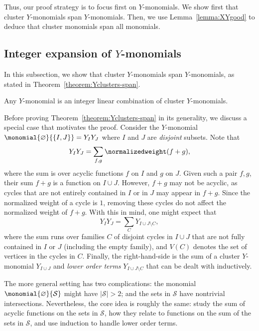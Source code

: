 Thus, our proof strategy is to focus first on \(Y\)-monomials. We show first that cluster \(Y\)-monomials span \(Y\)-monomials. Then, we use Lemma~\ref{lemma:XYgood} to deduce that cluster monomials span all monomials. 

\subsection{Integer expansion of \texorpdfstring{\(Y\)}{Y}-monomials} \label{subsection:Ymonomialsspanning}

In this subsection, we show that cluster \(Y\)-monomials span \(Y\)-monomials, as stated in Theorem~\ref{theorem:Yclusters-span}.

\begin{theo} \label{theorem:Yclusters-span}
    Any \(Y\)-monomial is an integer linear combination of cluster \(Y\)-monomials.
\end{theo}

Before proving Theorem~\ref{theorem:Yclusters-span} in its generality,
we discuss a special case that motivates the proof.
Consider the \(Y\)-monomial \(\monomial{\varnothing}{\{I, J\}} = Y_I Y_J\)
where \(I\) and \(J\) are \emph{disjoint} subsets.
Note that 
\begin{equation*}
    Y_I Y_J = \sum_{f, g} \normalizedweight(f + g),
\end{equation*}
where the sum is over acyclic functions \(f\) on \(I\) and \(g\) on \(J\).
Given such a pair \(f, g\), their sum \(f + g\) is a function on \(I \cup J\).
However, \(f + g\) may not be acyclic,
as cycles that are not entirely contained in \(I\) or in \(J\) may appear in \(f + g\).
Since the normalized weight of a cycle is \(1\),
removing these cycles do not affect the normalized weight of \(f + g\).
With this in mind, one might expect that
\begin{equation*}
    Y_I Y_J = \sum_{C} Y_{I \cup J \setminus C},
\end{equation*}
where the sum runs over families \(C\) of disjoint cycles in \(I \cup J\)
that are not fully contained in \(I\) or \(J\) (including the empty family),
and \(V(C)\) denotes the set of vertices in the cycles in \(C\).
Finally, the right-hand-side is the sum of a cluster \(Y\)-monomial \(Y_{I \cup J}\)
and \emph{lower order terms} \(Y_{I \cup J \setminus C}\) that can be dealt with inductively.

The more general setting has two complications:
the monomial \(\monomial{\varnothing}{\mathcal{S}}\) might have \(|\mathcal{S}| > 2\);
and the sets in \(\mathcal{S}\) have nontrivial intersections.
Nevertheless, the core idea is roughly the same:
study the sum of acyclic functions on the sets in \(\mathcal{S}\),
how they relate to functions on the sum of the sets in \(\mathcal{S}\),
and use induction to handle lower order terms.

